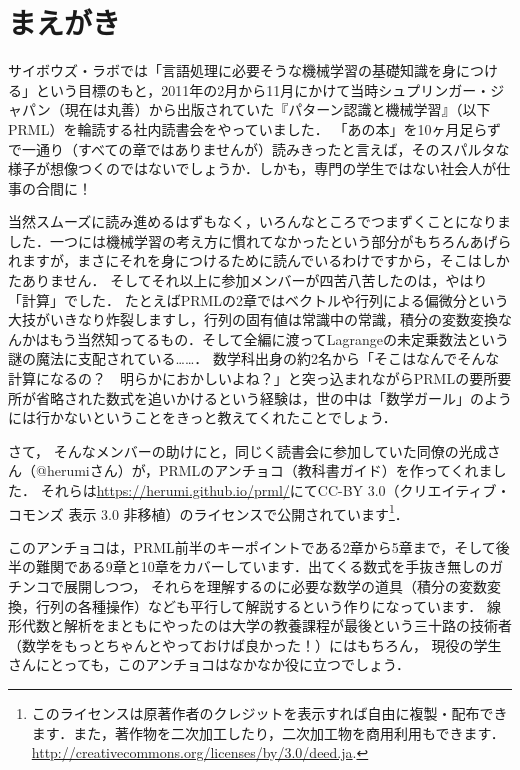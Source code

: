 \chapter*{まえがき}


サイボウズ・ラボでは「言語処理に必要そうな機械学習の基礎知識を身につける」という目標のもと，2011年の2月から11月にかけて当時シュプリンガー・ジャパン（現在は丸善）から出版されていた『パターン認識と機械学習』（以下PRML）を輪読する社内読書会をやっていました．
「あの本」を10ヶ月足らずで一通り（すべての章ではありませんが）読みきったと言えば，そのスパルタな様子が想像つくのではないでしょうか．しかも，専門の学生ではない社会人が仕事の合間に！

当然スムーズに読み進めるはずもなく，いろんなところでつまずくことになりました．一つには機械学習の考え方に慣れてなかったという部分がもちろんあげられますが，まさにそれを身につけるために読んでいるわけですから，そこはしかたありません．
そしてそれ以上に参加メンバーが四苦八苦したのは，やはり「計算」でした．
たとえばPRMLの2章ではベクトルや行列による偏微分という大技がいきなり炸裂しますし，行列の固有値は常識中の常識，積分の変数変換なんかはもう当然知ってるもの．そして全編に渡ってLagrangeの未定乗数法という謎の魔法に支配されている……．
数学科出身の約2名から「そこはなんでそんな計算になるの？　明らかにおかしいよね？」と突っ込まれながらPRMLの要所要所が省略された数式を追いかけるという経験は，世の中は「数学ガール」のようには行かないということをきっと教えてくれたことでしょう．

さて，
そんなメンバーの助けにと，同じく読書会に参加していた同僚の光成さん（@herumiさん）が，PRMLのアンチョコ（教科書ガイド）を作ってくれました．
それらは\url{https://herumi.github.io/prml/}にてCC-BY 3.0（クリエイティブ・コモンズ 表示 3.0 非移植）のライセンスで公開されています\footnote{このライセンスは原著作者のクレジットを表示すれば自由に複製・配布できます．また，著作物を二次加工したり，二次加工物を商用利用もできます．\url{http://creativecommons.org/licenses/by/3.0/deed.ja}.}．

このアンチョコは，PRML前半のキーポイントである2章から5章まで，そして後半の難関である9章と10章をカバーしています．出てくる数式を手抜き無しのガチンコで展開しつつ，
それらを理解するのに必要な数学の道具（積分の変数変換，行列の各種操作）なども平行して解説するという作りになっています．
線形代数と解析をまともにやったのは大学の教養課程が最後という三十路の技術者（数学をもっとちゃんとやっておけば良かった！）にはもちろん，
現役の学生さんにとっても，このアンチョコはなかなか役に立つでしょう．

